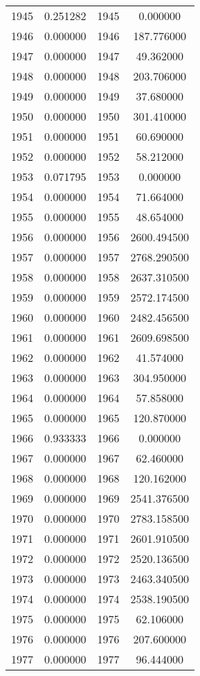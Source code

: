 \documentclass[12pt]{article}
\begin{document}
\begin{longtable}{@{}cccc@{}}
1945 & 0.251282 & 1945 & 0.000000 \\
1946 & 0.000000 & 1946 & 187.776000 \\
1947 & 0.000000 & 1947 & 49.362000 \\
1948 & 0.000000 & 1948 & 203.706000 \\
1949 & 0.000000 & 1949 & 37.680000 \\
1950 & 0.000000 & 1950 & 301.410000 \\
1951 & 0.000000 & 1951 & 60.690000 \\
1952 & 0.000000 & 1952 & 58.212000 \\
1953 & 0.071795 & 1953 & 0.000000 \\
1954 & 0.000000 & 1954 & 71.664000 \\
1955 & 0.000000 & 1955 & 48.654000 \\
1956 & 0.000000 & 1956 & 2600.494500 \\
1957 & 0.000000 & 1957 & 2768.290500 \\
1958 & 0.000000 & 1958 & 2637.310500 \\
1959 & 0.000000 & 1959 & 2572.174500 \\
1960 & 0.000000 & 1960 & 2482.456500 \\
1961 & 0.000000 & 1961 & 2609.698500 \\
1962 & 0.000000 & 1962 & 41.574000 \\
1963 & 0.000000 & 1963 & 304.950000 \\
1964 & 0.000000 & 1964 & 57.858000 \\
1965 & 0.000000 & 1965 & 120.870000 \\
1966 & 0.933333 & 1966 & 0.000000 \\
1967 & 0.000000 & 1967 & 62.460000 \\
1968 & 0.000000 & 1968 & 120.162000 \\
1969 & 0.000000 & 1969 & 2541.376500 \\
1970 & 0.000000 & 1970 & 2783.158500 \\
1971 & 0.000000 & 1971 & 2601.910500 \\
1972 & 0.000000 & 1972 & 2520.136500 \\
1973 & 0.000000 & 1973 & 2463.340500 \\
1974 & 0.000000 & 1974 & 2538.190500 \\
1975 & 0.000000 & 1975 & 62.106000 \\
1976 & 0.000000 & 1976 & 207.600000 \\
1977 & 0.000000 & 1977 & 96.444000 \\

\end{longtable}
\end{document}
